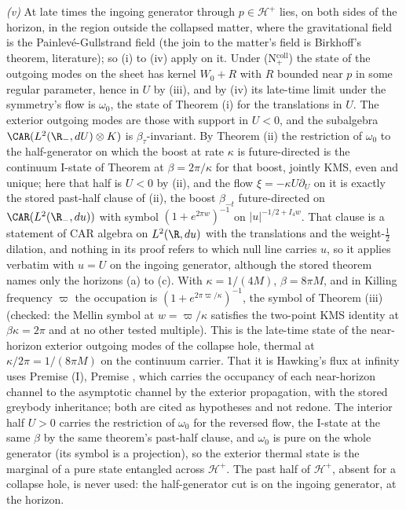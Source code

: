 \emph{(v)} At late times the ingoing generator through $p \in \mathcal{H}^{+}$ lies, on both sides of the horizon, in the region outside the collapsed matter, where the gravitational field is the Painlev\'e-Gullstrand field (the join to the matter's field is Birkhoff's theorem, literature); so (i) to (iv) apply on it. Under (N$_{+}^{\mathrm{coll}}$) the state of the outgoing modes on the sheet has kernel $W_{0} + R$ with $R$ bounded near $p$ in some regular parameter, hence in $U$ by (iii), and by (iv) its late-time limit under the symmetry's flow is $\omega_{0}$, the state of Theorem (i) for the translations in $U$. The exterior outgoing modes are those with support in $U < 0$, and the subalgebra $\CAR(L^{2}(\R_{-}, dU)\otimes K)$ is $\beta_{\tau}$-invariant. By Theorem (ii) the restriction of $\omega_{0}$ to the half-generator on which the boost at rate $\kappa$ is future-directed is the continuum I-state of Theorem  at $\beta = 2\pi/\kappa$ for that boost, jointly KMS, even and unique; here that half is $U < 0$ by (ii), and the flow $\xi = -\kappa U\partial_{U}$ on it is exactly the stored past-half clause of (ii), the boost $\beta_{-t}$ future-directed on $\CAR(L^{2}(\R_{-}, du))$ with symbol $(1 + e^{2\pi w})^{-1}$ on $|u|^{-1/2 + I_{4}w}$. That clause is a statement of CAR algebra on $L^{2}(\R, du)$ with the translations and the weight-$\tfrac12$ dilation, and nothing in its proof refers to which null line carries $u$, so it applies verbatim with $u = U$ on the ingoing generator, although the stored theorem names only the horizons (a) to (c). With $\kappa = 1/(4M)$, $\beta = 8\pi M$, and in Killing frequency $\varpi$ the occupation is $(1 + e^{2\pi\varpi/\kappa})^{-1}$, the symbol of Theorem (iii) (checked: the Mellin symbol at $w = \varpi/\kappa$ satisfies the two-point KMS identity at $\beta\kappa = 2\pi$ and at no other tested multiple). This is the late-time state of the near-horizon exterior outgoing modes of the collapse hole, thermal at $\kappa/2\pi = 1/(8\pi M)$ on the continuum carrier. That it is Hawking's flux at infinity uses Premise (I), Premise , which carries the occupancy of each near-horizon channel to the asymptotic channel by the exterior propagation, with the stored greybody inheritance; both are cited as hypotheses and not redone. The interior half $U > 0$ carries the restriction of $\omega_{0}$ for the reversed flow, the I-state at the same $\beta$ by the same theorem's past-half clause, and $\omega_{0}$ is pure on the whole generator (its symbol is a projection), so the exterior thermal state is the marginal of a pure state entangled across $\mathcal{H}^{+}$. The past half of $\mathcal{H}^{+}$, absent for a collapse hole, is never used: the half-generator cut is on the ingoing generator, at the horizon.

